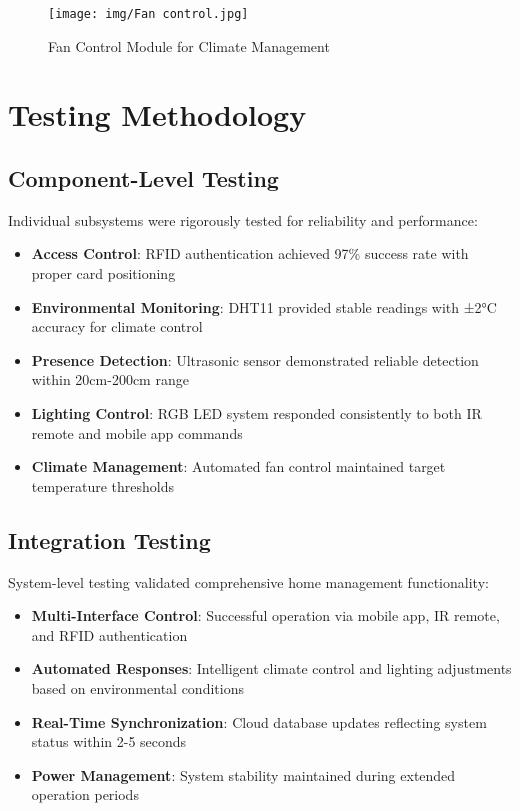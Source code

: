 \documentclass[12pt,a4paper]{report}
\begin{document}
\begin{figure}[H]
    \centering
    \texttt{[image: img/Fan control.jpg]}
    \caption{Fan Control Module for Climate Management}
    \label{fig:fan-control}
\end{figure}

\section{Testing Methodology}

\subsection{Component-Level Testing}
\noindent Individual subsystems were rigorously tested for reliability and performance:


\begin{itemize}
\item \textbf{Access Control}: RFID authentication achieved 97\% success rate with proper card positioning
\item \textbf{Environmental Monitoring}: DHT11 provided stable readings with ±2°C accuracy for climate control
\item \textbf{Presence Detection}: Ultrasonic sensor demonstrated reliable detection within 20cm-200cm range
\item \textbf{Lighting Control}: RGB LED system responded consistently to both IR remote and mobile app commands
\item \textbf{Climate Management}: Automated fan control maintained target temperature thresholds
\end{itemize}

\subsection{Integration Testing}
\noindent System-level testing validated comprehensive home management functionality:

\begin{itemize}
\item \textbf{Multi-Interface Control}: Successful operation via mobile app, IR remote, and RFID authentication
\item \textbf{Automated Responses}: Intelligent climate control and lighting adjustments based on environmental conditions
\item \textbf{Real-Time Synchronization}: Cloud database updates reflecting system status within 2-5 seconds
\item \textbf{Power Management}: System stability maintained during extended operation periods
\end{itemize}
\end{document}
